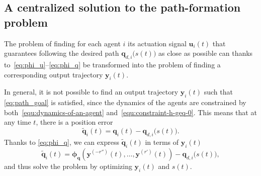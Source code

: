 \subsection{A centralized solution to the path-formation problem}
\label{ssec:}



The problem of finding for each agent $i$ its actuation signal $\bm{u}_i(t)$ that guarantees following the desired path $\bm{q}_{d,i} \big( s(t) \big)$ as close as possible can thanks to~\eqref{eq:phi_u}--\eqref{eq:phi_q} be transformed into the problem of finding a corresponding output trajectory $\bm{y}_i(t)$.

In general, it is not possible to find an output trajectory $\bm{y}_i(t)$ such that \eqref{eq:path_goal} is satisfied, since the dynamics of the agents are constrained by both~\eqref{equ:dynamics-of-an-agent} and~\eqref{equ:constraint-h-geq-0}. This means that at any time $t$, there is a position error
%
\begin{equation}
    \widetilde{\bm{q}}_i(t)
    =
    \bm{q}_i(t)
    -
    \bm{q}_{d,i} \big( s(t) \big) .
    \label{eq:q_tilde}
\end{equation}
%
Thanks to \eqref{eq:phi_q}, we can express $\widetilde{\bm{q}}_i(t)$ in terms of $\bm{y}_i(t)$
\begin{equation}
    \widetilde{\bm{q}}_i(t)
    =
    \bm{\phi}_{\bm{q}}\left(\bm{y}^{(-r'')}(t), \ldots, \bm{y}^{(r')}(t)\right)
    -
    \bm{q}_{d,i} \big( s(t) \big), \label{eq:y_tilde}
\end{equation}
and thus solve the problem by optimizing $\bm{y}_i(t)$ and $s(t)$.

